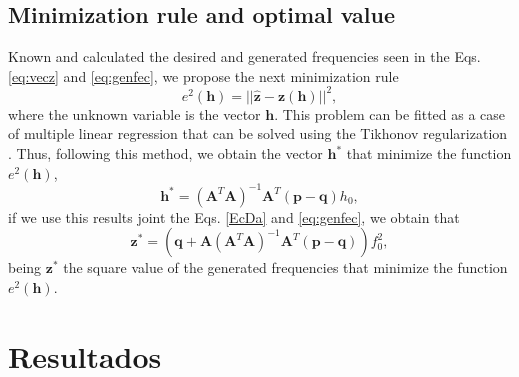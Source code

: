 \documentclass[11pt,twocolumn]{article}
\begin{document}
\subsection{Minimization rule and optimal value}
Known and calculated the desired and generated frequencies seen in the Eqs. \ref{eq:vecz} and \ref{eq:genfec},
we propose the next minimization rule
\begin{equation}
\label{eq:minimization}
e^2(\mathbf{h})= || \mathbf{\hat{z}} - \mathbf{z}(\mathbf{h}) ||^2,
\end{equation}
where the unknown variable is the vector $\mathbf{h}$.
This problem can be fitted as a case of multiple linear regression 
that can be solved using the Tikhonov regularization
\cite[pp. 79, 80]{pujaicoriverafernando2020}.
Thus, following this method, we obtain the vector $\mathbf{h}^{*}$ that minimize the function $e^2(\mathbf{h})$,
\begin{equation}
\label{eq:optimalh}
\mathbf{h}^{*}=
 \left(\mathbf{A}^T\mathbf{A}\right)^{-1}\mathbf{A}^T
 \left(\mathbf{p}-\mathbf{q}\right)
h_0,
\end{equation}
if we use this results joint the Eqs. \ref{EcDa} and \ref{eq:genfec}, 
we obtain that
\begin{equation}
\mathbf{z}^{*}=
\left(\mathbf{q}
+\mathbf{A}\left(\mathbf{A}^T\mathbf{A}\right)^{-1}\mathbf{A}^T
 \left(\mathbf{p}-\mathbf{q}\right) \right)
f_0^2,
\end{equation}
being $\mathbf{z}^{*}$ the square value of the generated frequencies
that minimize the function $e^2(\mathbf{h})$.

\section{Resultados}
\end{document}
